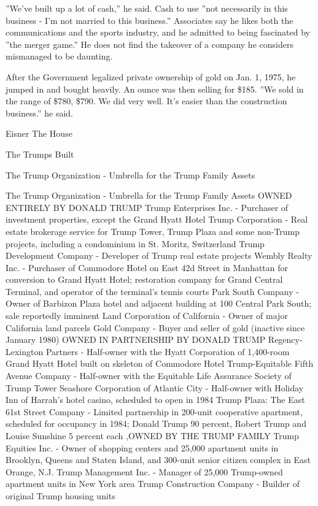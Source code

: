 ''We've built up a lot of cash,'' he said. Cash to use ''not necessarily
in this business - I'm not married to this business.'' Associates say he
likes both the communications and the sports industry, and he admitted
to being fascinated by ''the merger game.'' He does not find the
takeover of a company he considers mismanaged to be daunting.

After the Government legalized private ownership of gold on Jan. 1,
1975, he jumped in and bought heavily. An ounce was then selling for
\$185. ''We sold in the range of \$780, \$790. We did very well. It's
easier than the construction business.'' he said.

Eisner The House

The Trumps Built

The Trump Organization - Umbrella for the Trump Family Assets

The Trump Organization - Umbrella for the Trump Family Assets OWNED
ENTIRELY BY DONALD TRUMP Trump Enterprises Inc. - Purchaser of
investment properties, except the Grand Hyatt Hotel Trump Corporation -
Real estate brokerage service for Trump Tower, Trump Plaza and some
non-Trump projects, including a condominium in St. Moritz, Switzerland
Trump Development Company - Developer of Trump real estate projects
Wembly Realty Inc. - Purchaser of Commodore Hotel on East 42d Street in
Manhattan for conversion to Grand Hyatt Hotel; restoration company for
Grand Central Terminal, and operator of the terminal's tennis courts
Park South Company - Owner of Barbizon Plaza hotel and adjacent building
at 100 Central Park South; sale reportedly imminent Land Corporation of
California - Owner of major California land parcels Gold Company - Buyer
and seller of gold (inactive since January 1980) OWNED IN PARTNERSHIP BY
DONALD TRUMP Regency-Lexington Partners - Half-owner with the Hyatt
Corporation of 1,400-room Grand Hyatt Hotel built on skeleton of
Commodore Hotel Trump-Equitable Fifth Avenue Company - Half-owner with
the Equitable Life Assurance Society of Trump Tower Seashore Corporation
of Atlantic City - Half-owner with Holiday Inn of Harrah's hotel casino,
scheduled to open in 1984 Trump Plaza: The East 61st Street Company -
Limited partnership in 200-unit cooperative apartment, scheduled for
occupancy in 1984; Donald Trump 90 percent, Robert Trump and Louise
Sunshine 5 percent each ,OWNED BY THE TRUMP FAMILY Trump Equities Inc. -
Owner of shopping centers and 25,000 apartment units in Brooklyn, Queens
and Staten Island, and 300-unit senior citizen complex in East Orange,
N.J. Trump Management Inc. - Manager of 25,000 Trump-owned apartment
units in New York area Trump Construction Company - Builder of original
Trump housing units

